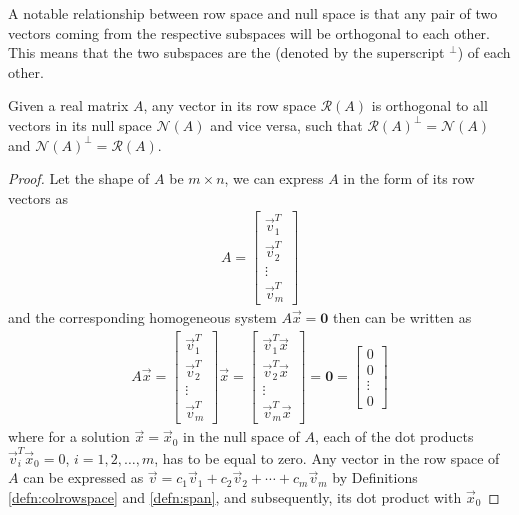 A notable relationship between row space and null space is that any pair of two vectors coming from the respective subspaces will be orthogonal to each other. This means that the two subspaces are the  (denoted by the superscript $^\perp$) of each other.
\begin{proper}
\label{proper:rownullortho}
Given a real matrix $A$, any vector in its row space $\mathcal{R}(A)$ is orthogonal to all vectors in its null space $\mathcal{N}(A)$ and vice versa, such that $\mathcal{R}(A)^\perp = \mathcal{N}(A)$ and $\mathcal{N}(A)^\perp = \mathcal{R}(A)$.
\end{proper}
\begin{proof}
Let the shape of $A$ be $m \times n$, we can express $A$ in the form of its row vectors as
\begin{align*}
A = 
\left[\begin{array}{c}
\vec{v}_1^T \\
\hline
\vec{v}_2^T \\
\hline
\vdots \\
\hline
\vec{v}_m^T
\end{array}\right]
\end{align*}
and the corresponding homogeneous system $A\vec{x} = \textbf{0}$ then can be written as
\begin{align*}
A\vec{x} =
\left[\begin{array}{c}
\vec{v}_1^T \\
\hline
\vec{v}_2^T \\
\hline
\vdots \\
\hline
\vec{v}_m^T
\end{array}\right]
\vec{x}
=
\left[\begin{array}{c}
\vec{v}_1^T\vec{x} \\
\vec{v}_2^T\vec{x} \\
\vdots \\
\vec{v}_m^T\vec{x}
\end{array}\right]
= \textbf{0}
=
\left[\begin{array}{c}
0 \\
0 \\
\vdots \\
0
\end{array}\right]
\end{align*}
where for a solution $\vec{x} = \vec{x}_0$ in the null space of $A$, each of the dot products $\vec{v}_i^T\vec{x}_0 = 0$, $i = 1, 2, \ldots, m$, has to be equal to zero. Any vector in the row space of $A$ can be expressed as $\vec{v} = c_1\vec{v}_1 + c_2\vec{v}_2 + \cdots + c_m\vec{v}_m$ by Definitions \ref{defn:colrowspace} and \ref{defn:span}, and subsequently, its dot product with $\vec{x}_0$

\end{proof}
